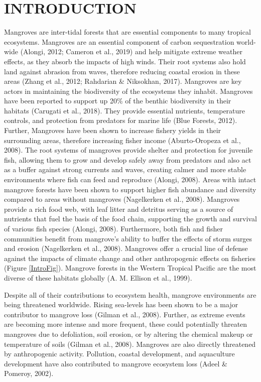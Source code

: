\documentclass[
  12pt,
]{article}
\begin{document}
\hypertarget{introduction}{%
\section{INTRODUCTION}\label{introduction}}

Mangroves are inter-tidal forests that are essential components to many tropical ecosystems. Mangroves are an essential component of carbon sequestration world-wide (Alongi, 2012; Cameron et al., 2019) and help mitigate extreme weather effects, as they absorb the impacts of high winds. Their root systems also hold land against abrasion from waves, therefore reducing coastal erosion in these areas (Zhang et al., 2012; Rahdarian \& Niksokhan, 2017). Mangroves are key actors in maintaining the biodiversity of the ecosystems they inhabit. Mangroves have been reported to support up 20\% of the benthic biodiversity in their habitats (Carugati et al., 2018). They provide essential nutrients, temperature controls, and protection from predators for marine life (Blue Forests, 2012). Further, Mangroves have been shown to increase fishery yields in their surrounding areas, therefore increasing fisher income (Aburto-Oropeza et al., 2008). The root systems of mangroves provide shelter and protection for juvenile fish, allowing them to grow and develop safely away from predators and also act as a buffer against strong currents and waves, creating calmer and more stable environments where fish can feed and reproduce (Alongi, 2008). Areas with intact mangrove forests have been shown to support higher fish abundance and diversity compared to areas without mangroves (Nagelkerken et al., 2008). Mangroves provide a rich food web, with leaf litter and detritus serving as a source of nutrients that fuel the basis of the food chain, supporting the growth and survival of various fish species (Alongi, 2008). Furthermore, both fish and fisher communities benefit from mangrove's ability to buffer the effects of storm surges and erosion (Nagelkerken et al., 2008). Mangroves offer a crucial line of defense against the impacts of climate change and other anthropogenic effects on fisheries (Figure \ref{IntroFig}). Mangrove forests in the Western Tropical Pacific are the most diverse of these habitats globally (A. M. Ellison et al., 1999).

Despite all of their contributions to ecosystem health, mangrove environments are being threatened worldwide. Rising sea-levels has been shown to be a major contributor to mangrove loss (Gilman et al., 2008). Further, as extreme events are becoming more intense and more frequent, these could potentially threaten mangroves due to defoliation, soil erosion, or by altering the chemical makeup or temperature of soils (Gilman et al., 2008). Mangroves are also directly threatened by anthropogenic activity. Pollution, coastal development, and aquaculture development have also contributed to mangrove ecosystem loss (Adeel \& Pomeroy, 2002).
\end{document}
